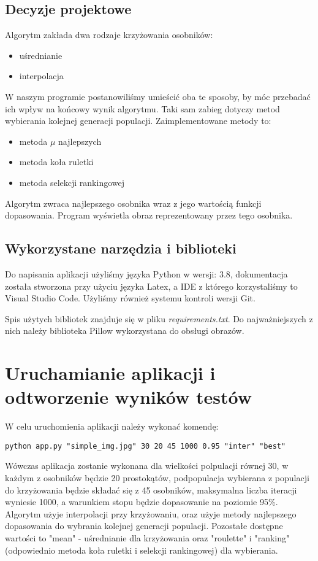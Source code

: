 \documentclass{article}
\begin{document}
\subsection{Decyzje projektowe}
Algorytm zakłada dwa rodzaje krzyżowania osobników:
\begin{itemize}
    \item uśrednianie
    \item interpolacja
\end{itemize}
W naszym programie postanowiliśmy umieścić oba te sposoby, by móc przebadać ich wpływ na końcowy wynik algorytmu.
Taki sam zabieg dotyczy metod wybierania kolejnej generacji populacji. Zaimplementowane metody to:
\begin{itemize}
    \item metoda $\mu$ najlepszych
    \item metoda koła ruletki
    \item metoda selekcji rankingowej
\end{itemize}
Algorytm zwraca najlepszego osobnika wraz z jego wartością funkcji dopasowania. Program wyświetla obraz reprezentowany przez tego osobnika.
\subsection{Wykorzystane narzędzia i biblioteki}
Do napisania aplikacji użyliśmy języka Python w wersji: 3.8, dokumentacja została stworzona przy użyciu języka Latex, a IDE z którego korzystaliśmy to Visual Studio Code. Użyliśmy również systemu kontroli wersji Git.

Spis użytych bibliotek znajduje się w pliku {\it requirements.txt}.
Do najważniejszych z nich należy biblioteka Pillow wykorzystana do obsługi obrazów.
\section{Uruchamianie aplikacji i odtworzenie wyników testów}
W celu uruchomienia aplikacji należy wykonać komendę:
\begin{verbatim}
python app.py "simple_img.jpg" 30 20 45 1000 0.95 "inter" "best"
\end{verbatim}
Wówczas aplikacja zostanie wykonana dla wielkości polpulacji równej 30, w każdym z osobników będzie 20 prostokątów, podpopulacja wybierana z populacji do krzyżowania będzie składać się z 45 osobników, maksymalna liczba iteracji wyniesie 1000, a warunkiem stopu będzie dopasowanie na poziomie 95\%.
Algorytm użyje interpolacji przy krzyżowaniu, oraz użyje metody najlepszego dopasowania do wybrania kolejnej generacji populacji. Pozostałe dostępne wartości to "mean" - uśrednianie dla krzyżowania oraz "roulette" i "ranking" (odpowiednio metoda koła ruletki i selekcji rankingowej) dla wybierania.

\end{document}
